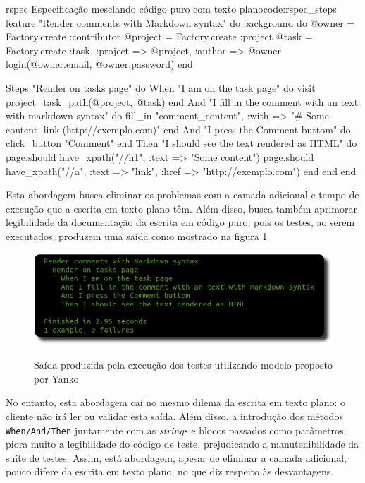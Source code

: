 \begin{mycode}{rspec}%
{Especificação mesclando código puro com texto plano}{code:rspec_steps}
feature "Render comments with Markdown syntax" do
  background do
    @owner = Factory.create :contributor
    @project = Factory.create :project
    @task = Factory.create :task, :project => @project, :author => @owner
    login(@owner.email, @owner.password)
  end

  Steps "Render on tasks page" do
    When "I am on the task page" do
      visit project_task_path(@project, @task)
    end
    And "I fill in the comment with an text with markdown syntax" do
      fill_in "comment_content", :with => "# Some content [link](http://exemplo.com)"
    end
    And "I press the Comment buttom" do
      click_button "Comment"
    end
    Then "I should see the text rendered as HTML" do
      page.should have_xpath("//h1", :text => "Some content")
      page.should have_xpath("//a", :text => "link", :href => "http://exemplo.com")
    end
  end
end
\end{mycode}

Esta abordagem busca eliminar os problemas com a camada adicional e tempo de execução que a escrita em texto plano têm. Além disso, busca também aprimorar legibilidade da documentação da escrita em código puro, pois os testes, ao serem executados, produzem uma saída como mostrado na figura \ref{img:output-novo-modelo}

\begin{figure}[h]
  \center
  \caption{Saída produzida pela execução dos testes utilizando modelo proposto por Yanko}
  \includegraphics[scale=0.6]{images/output-novo-modelo}
  \label{img:output-novo-modelo}
\end{figure}

No entanto, esta abordagem cai no mesmo dilema da escrita em texto plano: o cliente não irá ler ou validar esta saída. Além disso, a introdução dos métodos \texttt{When/And/Then} juntamente com as \textit{strings} e blocos passados como parâmetros, piora muito a legibilidade do código de teste, prejudicando a manutenibilidade da suíte de testes. Assim, está abordagem, apesar de eliminar a camada adicional, pouco difere da escrita em texto plano, no que diz respeito às desvantagens.


